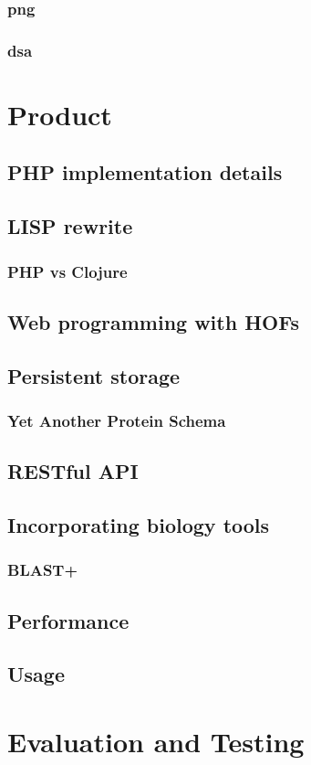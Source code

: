 \subsection{png}
\subsection{dsa}


\chapter{Product}

\section{PHP implementation details}

\section{LISP rewrite}
\subsection{PHP vs Clojure}
\section{Web programming with HOFs}

\section{Persistent storage}
\subsection{Yet Another Protein Schema}

\section{RESTful API}

\section{Incorporating biology tools}
\subsection{BLAST+}

\section{Performance}

\section{Usage}

\chapter{Evaluation and Testing}



\appendix

\printbibliography


